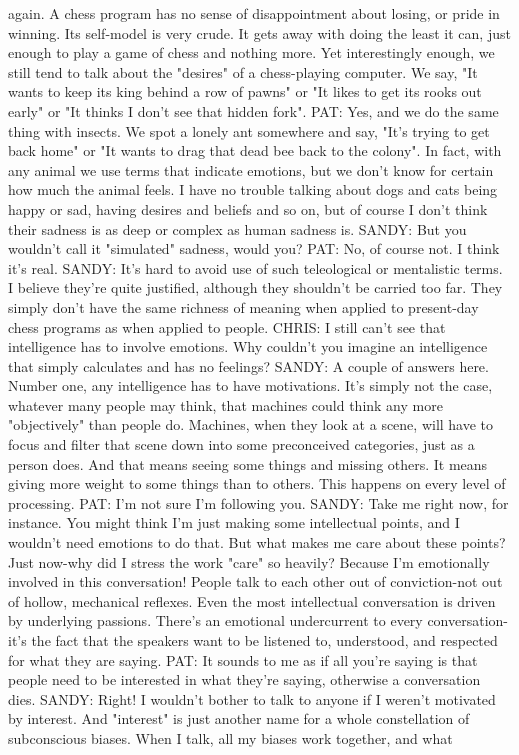    again. A chess program has no sense of disappointment about losing, or pride in
   winning. Its self-model is very crude. It gets away with doing the least it can, just
   enough to play a game of chess and nothing more. Yet interestingly enough, we
   still tend to talk about the "desires" of a chess-playing computer. We say, "It
   wants to keep its king behind a row of pawns" or "It likes to get its rooks out
   early" or "It thinks I don't see that hidden fork".
PAT: Yes, and we do the same thing with insects. We spot a lonely ant somewhere
   and say, "It's trying to get back home" or "It wants to drag that dead bee back to
   the colony". In fact, with any animal we use terms that indicate emotions, but we
   don't know for certain how much the animal feels. I have no trouble talking about
   dogs and cats being happy or sad, having desires and beliefs and so on, but of
   course I don't think their sadness is as deep or complex as human sadness is.
SANDY: But you wouldn't call it "simulated" sadness, would you?
PAT: No, of course not. I think it's real.
SANDY: It's hard to avoid use of such teleological or mentalistic terms. I believe
   they're quite justified, although they shouldn't be carried too far. They simply
   don't have the same richness of meaning when applied to present-day chess
   programs as when applied to people.
CHRIS: I still can't see that intelligence has to involve emotions. Why couldn't you
   imagine an intelligence that simply calculates and has no feelings?
SANDY: A couple of answers here. Number one, any intelligence has to have
   motivations. It's simply not the case, whatever many people may think, that
   machines could think any more "objectively" than people do. Machines, when
   they look at a scene, will have to focus and filter that scene down into some
   preconceived categories, just as a person does. And that means seeing some
   things and missing others. It means giving more weight to some things than to
   others. This happens on every level of processing.
PAT: I'm not sure I'm following you.
SANDY: Take me right now, for instance. You might think I'm just making some
   intellectual points, and I wouldn't need emotions to do that. But what makes me
   care about these points? Just now-why did I stress the work "care" so heavily?
   Because I'm emotionally involved in this conversation! People talk to each other
   out of conviction-not out of hollow, mechanical reflexes. Even the most
   intellectual conversation is driven by underlying passions. There's an emotional
   undercurrent to every conversation-it's the fact that the speakers want to be
   listened to, understood, and respected for what they are saying.
PAT: It sounds to me as if all you're saying is that people need to be interested in
   what they're saying, otherwise a conversation dies.
SANDY: Right! I wouldn't bother to talk to anyone if I weren't motivated by interest.
   And "interest" is just another name for a whole constellation of subconscious
   biases. When I talk, all my biases work together, and what




